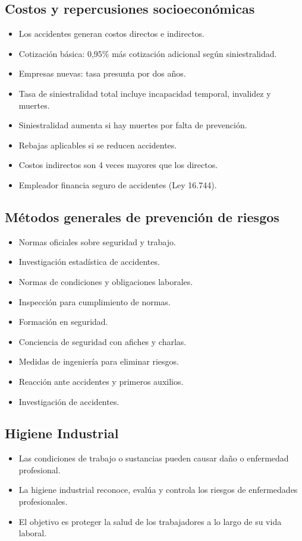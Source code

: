 \documentclass{article} %
\begin{document}
\subsection{Costos y repercusiones socioeconómicas}
\begin{itemize}
    \item Los accidentes generan costos directos e indirectos.
    \item Cotización básica: 0,95\% más cotización adicional según siniestralidad.
    \item Empresas nuevas: tasa presunta por dos años.
    \item Tasa de siniestralidad total incluye incapacidad temporal, invalidez y muertes.
    \item Siniestralidad aumenta si hay muertes por falta de prevención.
    \item Rebajas aplicables si se reducen accidentes.
    \item Costos indirectos son 4 veces mayores que los directos.
    \item Empleador financia seguro de accidentes (Ley 16.744).
\end{itemize}

\subsection{Métodos generales de prevención de riesgos}
\begin{itemize}
    \item Normas oficiales sobre seguridad y trabajo.
    \item Investigación estadística de accidentes.
    \item Normas de condiciones y obligaciones laborales.
    \item Inspección para cumplimiento de normas.
    \item Formación en seguridad.
    \item Conciencia de seguridad con afiches y charlas.
    \item Medidas de ingeniería para eliminar riesgos.
    \item Reacción ante accidentes y primeros auxilios.
    \item Investigación de accidentes.
\end{itemize}

\subsection{Higiene Industrial}
\begin{itemize}
    \item Las condiciones de trabajo o sustancias pueden causar daño o enfermedad profesional.
    \item La higiene industrial reconoce, evalúa y controla los riesgos de enfermedades profesionales.
    \item El objetivo es proteger la salud de los trabajadores a lo largo de su vida laboral.
\end{itemize}
\end{document}
